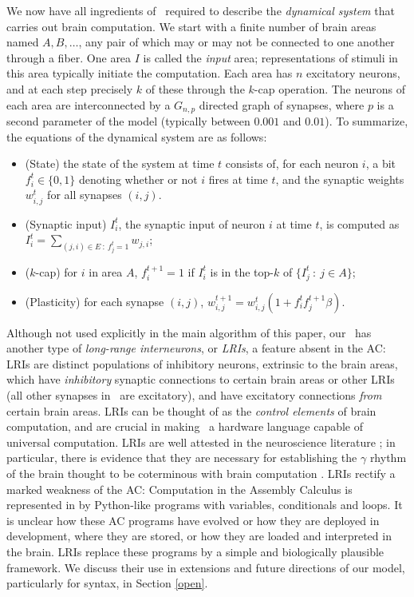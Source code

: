 \documentclass{article}
\begin{document}
We now have all ingredients of \name\  required to describe the \emph{dynamical system} that carries out brain computation. We start with a finite number of brain areas named $A,B,\ldots$, any pair of which may or may not be connected to one another through a fiber. One area $I$ is called the \emph{input} area; representations of stimuli in this area typically initiate the computation.  Each area has $n$ excitatory neurons, and at each step precisely $k$ of these through the $k$-cap operation. The neurons of each area are interconnected by a $G_{n,p}$ directed graph of synapses, where $p$ is a second parameter of the model (typically between $0.001$ and $0.01$). To summarize, the equations of the dynamical system are as follows:
\begin{itemize}
\item (State) the state of the system at time $t$ consists of, for each neuron $i$, a bit $f_i^t \in \{0,1\}$ denoting whether or not $i$ fires at time $t$, and the synaptic weights $w_{i,j}^t$ for all synapses $(i,j)$. 
\item (Synaptic input) $I_i^t$, the synaptic input of neuron $i$ at time $t$, is computed as $I_i^t = \sum_{(j,i)\in E~:~f_j^t=1} w_{j,i}$;
\item ($k$-cap) for $i$ in area $A$, $f_i^{t+1}=1$ if $I_i^t$ is in the top-$k$ of $\{I_j^t~:~j \in A\}$; 
\item (Plasticity) for each synapse $(i,j)$, $w_{i,j}^{t+1} = w_{i,j}^t(1+f_i^t f_j^{t+1} \beta)$.
\end{itemize}

Although not used explicitly in the main algorithm of this paper, our \name\ has another type of \emph{long-range interneurons}, or \emph{LRIs}, a feature absent in the AC: LRIs are distinct populations of inhibitory neurons, extrinsic to the brain areas, which have \emph{inhibitory} synaptic connections to certain brain areas or other LRIs (all other synapses in \name\ are excitatory), and have excitatory connections \emph{from} certain brain areas.  LRIs can be thought of as the \emph{control elements} of brain computation, and are crucial in making \name\ a hardware language capable of universal computation. LRIs are well attested in the neuroscience literature \citep{JinnoLRI,MelzerLRI}; in particular, there is evidence that they are necessary for establishing the $\gamma$ rhythm of the brain thought to be coterminous with brain computation \citep{RouxBuzsaki}.  LRIs rectify a marked weakness of the AC: Computation in the Assembly Calculus is represented in \citet{PNAS} by Python-like programs with variables, conditionals and loops.  It is unclear how these AC programs have evolved or how they are deployed in development, where they are stored, or how they are loaded and interpreted in the brain. LRIs replace these programs by a simple and biologically plausible framework. We discuss their use in extensions and future directions of our model, particularly for syntax, in Section \ref{open}.
\end{document}
